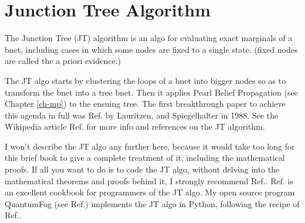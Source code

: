 \chapter{Junction Tree Algorithm}
\label{ch-junc-tree}
The Junction Tree (JT)
algorithm
is an algo
for evaluating
exact marginals
of a bnet, 
including cases in which
some nodes are fixed to a single state.
(fixed nodes
are called the a priori evidence.)

The JT algo
starts by  
clustering
the loops of a bnet into bigger nodes
so as  to
transform the bnet into a tree bnet.
Then it applies
Pearl Belief Propagation (see
Chapter \ref{ch-mp}) to the ensuing tree.
The first breakthrough 
paper to achieve this agenda in full
was Ref.\cite{lauritzen1988}
by Lauritzen, and Spiegelhalter in 1988.
See the Wikipedia article 
Ref.\cite{wiki-junc-tree}
for more info and
 references on the JT algorithm. 

I won't describe
the JT algo
any further here,
because it would take too
long for this brief book
to give a complete treatment
of it, including the mathematical proofs.
If all you want to do is to
code the JT algo, without
delving into the mathematical theorems
and proofs behind it, I 
strongly recommend 
Ref.\cite{huang1996}.
Ref.\cite{huang1996} is 
an excellent cookbook
for programmers of the JT algo. My
open source  
program QuantumFog (see Ref.\cite{qfog})
implements the
JT algo in Python, 
following the recipe of
Ref.\cite{huang1996}.